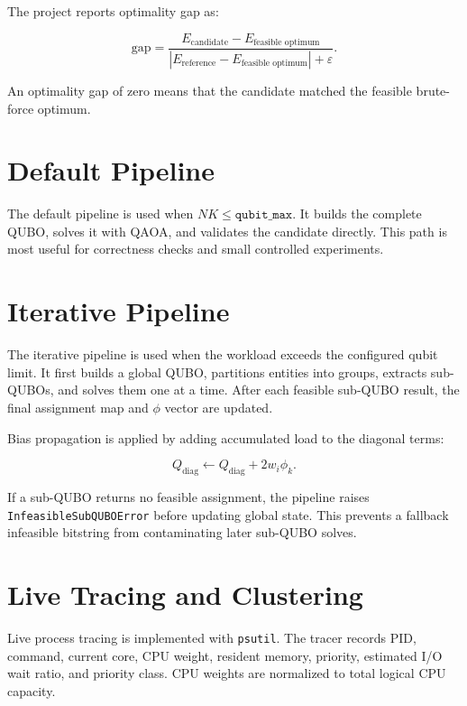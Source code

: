 \documentclass[12pt,a4paper,oneside]{report}
\begin{document}
The project reports optimality gap as:

\begin{equation}
  \text{gap} =
  \frac{E_{\text{candidate}} - E_{\text{feasible optimum}}}
  {\left|E_{\text{reference}} - E_{\text{feasible optimum}}\right| +
  \varepsilon}.
\end{equation}

An optimality gap of zero means that the candidate matched the feasible
brute-force optimum.

\section{Default Pipeline}

The default pipeline is used when \(N K \leq \texttt{qubit\_max}\). It builds
the complete QUBO, solves it with QAOA, and validates the candidate directly.
This path is most useful for correctness checks and small controlled
experiments.

\section{Iterative Pipeline}

The iterative pipeline is used when the workload exceeds the configured qubit
limit. It first builds a global QUBO, partitions entities into groups, extracts
sub-QUBOs, and solves them one at a time. After each feasible sub-QUBO result,
the final assignment map and \(\phi\) vector are updated.

Bias propagation is applied by adding accumulated load to the diagonal terms:

\begin{equation}
  Q_{\text{diag}} \leftarrow Q_{\text{diag}} + 2 w_i \phi_k .
\end{equation}

If a sub-QUBO returns no feasible assignment, the pipeline raises
\texttt{InfeasibleSubQUBOError} before updating global state. This prevents a
fallback infeasible bitstring from contaminating later sub-QUBO solves.

\section{Live Tracing and Clustering}

Live process tracing is implemented with \texttt{psutil}. The tracer records
PID, command, current core, CPU weight, resident memory, priority, estimated I/O
wait ratio, and priority class. CPU weights are normalized to total logical CPU
capacity.
\end{document}
